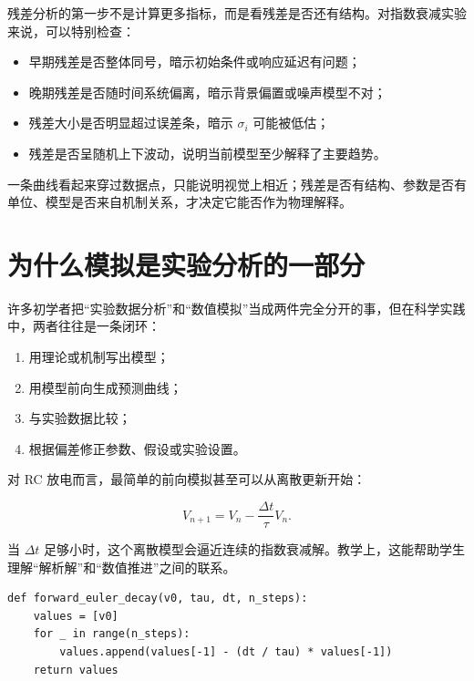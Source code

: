 残差分析的第一步不是计算更多指标，而是看残差是否还有结构。对指数衰减实验来说，可以特别检查：

\begin{itemize}
    \item 早期残差是否整体同号，暗示初始条件或响应延迟有问题；
    \item 晚期残差是否随时间系统偏离，暗示背景偏置或噪声模型不对；
    \item 残差大小是否明显超过误差条，暗示 $\sigma_i$ 可能被低估；
    \item 残差是否呈随机上下波动，说明当前模型至少解释了主要趋势。
\end{itemize}

\begin{warnbox}[好看的曲线不等于好模型]
一条曲线看起来穿过数据点，只能说明视觉上相近；残差是否有结构、参数是否有单位、模型是否来自机制关系，才决定它能否作为物理解释。
\end{warnbox}

\section{为什么模拟是实验分析的一部分}

许多初学者把“实验数据分析”和“数值模拟”当成两件完全分开的事，但在科学实践中，两者往往是一条闭环：

\begin{enumerate}
    \item 用理论或机制写出模型；
    \item 用模型前向生成预测曲线；
    \item 与实验数据比较；
    \item 根据偏差修正参数、假设或实验设置。
\end{enumerate}

对 RC 放电而言，最简单的前向模拟甚至可以从离散更新开始：

\[
V_{n+1} = V_n - \frac{\Delta t}{\tau} V_n.
\]

当 $\Delta t$ 足够小时，这个离散模型会逼近连续的指数衰减解。教学上，这能帮助学生理解“解析解”和“数值推进”之间的联系。

\begin{examplebox}[最小前向模拟]
\begin{lstlisting}[style=pythonstyle]
def forward_euler_decay(v0, tau, dt, n_steps):
    values = [v0]
    for _ in range(n_steps):
        values.append(values[-1] - (dt / tau) * values[-1])
    return values
\end{lstlisting}
\end{examplebox}

